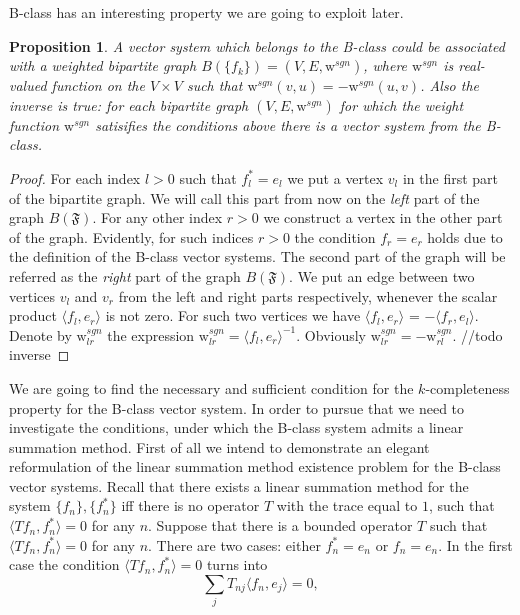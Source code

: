 \documentclass[12pt]{article}
\newtheorem{prop}{Proposition}
\theoremstyle{definition}
\newcommand{\fsys}{\mathfrak{F}}
\newcommand{\sgnwt}{\mathrm{w}^{sgn}}
\numberwithin{remark}{section}
\numberwithin{theorem}{section}
\numberwithin{prop}{section}
\numberwithin{equation}{section}
\numberwithin{lemma}{section}
\numberwithin{prop_under_lemma}{lemma}
\begin{document}
    B-class has an interesting property we are going to exploit later.
    \begin{prop}
        A vector system which belongs to the B-class could be associated with a 
        weighted bipartite graph $B(\{f_k\}) = (V, E, \sgnwt)$, where $\sgnwt$ is real-valued function on the $V\times V$ such that
        $\sgnwt(v, u) = -\sgnwt(u, v)$.
        Also the inverse is true: for each bipartite graph $(V, E, \sgnwt)$ for which the weight function
        $\sgnwt$ satisifies the conditions above there is a vector system from the B-class.
    \end{prop}
    \begin{proof}
        For each index $l > 0$ such that $f^*_l = e_l$ we put a vertex $v_l$ in the first part of the bipartite graph.
        We will call this part from now on the \textit{left} part of the graph $B(\fsys)$.
        For any other index $r > 0$ we construct a vertex in the other part of the graph.
        Evidently, for such indices $r > 0$ the condition $f_r = e_r$ holds due to the definition of the B-class vector systems.
        The second part of the graph will be referred as the \textit{right} part of the graph $B(\fsys)$.
        We put an edge between two vertices $v_l$ and $v_r$ from the left and right parts respectively,
        whenever the scalar product $\langle f_l, e_r \rangle$ is not zero.
        For such two vertices we have $\langle f_l, e_r \rangle$ = $-\langle f_r, e_l \rangle$.
        Denote by $\sgnwt_{lr}$ the expression $\sgnwt_{lr} = \langle f_l, e_r \rangle^{-1}$.
        Obviously $\sgnwt_{lr} = -\sgnwt_{rl}$.
        //todo inverse
    \end{proof}
    We are going to find the necessary and sufficient condition for the $k$-completeness property for the B-class vector system.
    In order to pursue that we need to investigate the conditions, under which the B-class system admits a linear summation method.
    First of all we intend to demonstrate an elegant reformulation of the linear summation method existence problem for
    the B-class vector systems.
    Recall that there exists a linear summation method for the system $\{f_n\}, \{f^*_n\}$
    iff there is no operator $T$ with the trace equal to $1$, such that $\langle Tf_n, f_n^*\rangle = 0$ for any $n$.
    Suppose that there is a bounded operator $T$ such that $\langle Tf_n, f_n^*\rangle = 0$ for any $n$.
    There are two cases: either $f^*_n = e_n$ or $f_n = e_n$.
    In the first case the condition $\langle Tf_n, f_n^*\rangle = 0$ turns into
    \begin{equation}
        \label{left-eqn}
        \sum_j T_{nj} \langle f_n, e_j \rangle = 0,
    \end{equation}
\end{document}
